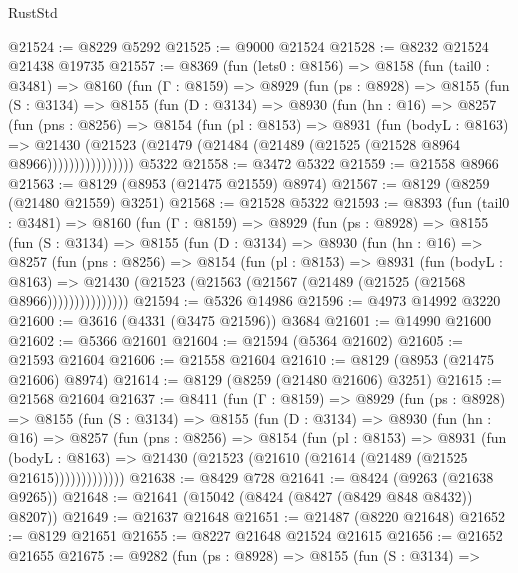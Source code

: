 \begin{lexlean}{RustStd}
\begin{coremodule}
@21524 := @8229 @5292
@21525 := @9000 @21524
@21528 := @8232 @21524 @21438 @19735
@21557 := @8369
    (fun (lets0 : @8156) =>
    @8158
      (fun (tail0 : @3481) =>
      @8160
        (fun (Γ : @8159) =>
        @8929
          (fun (ps : @8928) =>
          @8155
            (fun (S : @3134) =>
            @8155
              (fun (D : @3134) =>
              @8930
                (fun (hn : @16) =>
                @8257
                  (fun (pns : @8256) =>
                  @8154
                    (fun (pl : @8153) =>
                    @8931
                      (fun (bodyL : @8163) =>
                      @21430
                        (@21523 (@21479 (@21484 (@21489 (@21525 (@21528 @8964 @8966))))))))))))))))
    @5322
@21558 := @3472 @5322
@21559 := @21558 @8966
@21563 := @8129 (@8953 (@21475 @21559) @8974)
@21567 := @8129 (@8259 (@21480 @21559) @3251)
@21568 := @21528 @5322
@21593 := @8393
    (fun (tail0 : @3481) =>
    @8160
      (fun (Γ : @8159) =>
      @8929
        (fun (ps : @8928) =>
        @8155
          (fun (S : @3134) =>
          @8155
            (fun (D : @3134) =>
            @8930
              (fun (hn : @16) =>
              @8257
                (fun (pns : @8256) =>
                @8154
                  (fun (pl : @8153) =>
                  @8931
                    (fun (bodyL : @8163) =>
                    @21430 (@21523 (@21563 (@21567 (@21489 (@21525 (@21568 @8966)))))))))))))))
@21594 := @5326 @14986
@21596 := @4973 @14992 @3220
@21600 := @3616 (@4331 (@3475 @21596)) @3684
@21601 := @14990 @21600
@21602 := @5366 @21601
@21604 := @21594 (@5364 @21602)
@21605 := @21593 @21604
@21606 := @21558 @21604
@21610 := @8129 (@8953 (@21475 @21606) @8974)
@21614 := @8129 (@8259 (@21480 @21606) @3251)
@21615 := @21568 @21604
@21637 := @8411
    (fun (Γ : @8159) =>
    @8929
      (fun (ps : @8928) =>
      @8155
        (fun (S : @3134) =>
        @8155
          (fun (D : @3134) =>
          @8930
            (fun (hn : @16) =>
            @8257
              (fun (pns : @8256) =>
              @8154
                (fun (pl : @8153) =>
                @8931
                  (fun (bodyL : @8163) =>
                  @21430 (@21523 (@21610 (@21614 (@21489 (@21525 @21615)))))))))))))
@21638 := @8429 @728
@21641 := @8424 (@9263 (@21638 @9265))
@21648 := @21641 (@15042 (@8424 (@8427 (@8429 @848 @8432)) @8207))
@21649 := @21637 @21648
@21651 := @21487 (@8220 @21648)
@21652 := @8129 @21651
@21655 := @8227 @21648 @21524 @21615
@21656 := @21652 @21655
@21675 := @9282
    (fun (ps : @8928) =>
    @8155
      (fun (S : @3134) =>

\end{coremodule}
\end{lexlean}
